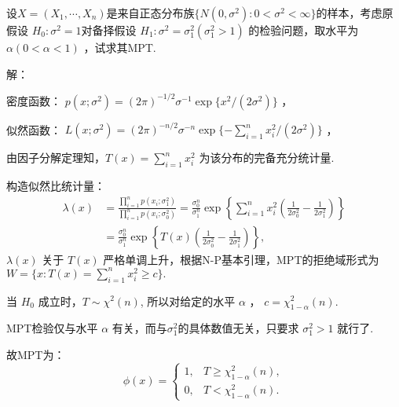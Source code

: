 \begin{example}
    设$ X=\left(X_{1}, \cdots, X_{n}\right) $是来自正态分布族$ \{N(0, \sigma^{2}): 0<\sigma^{2}<\infty\} $的样本，考虑原假设 $H_{0}: \sigma^{2}=1 $对备择假设 $H_{1}: \sigma^{2}=\sigma_{1}^{2}(\sigma_{1}^{2}>1)$ 的检验问题，取水平为 $\alpha(0<\alpha<1)$ ，试求其MPT.

    解：

    密度函数： $p(x;\sigma^2)=(2\pi)^{-1/2}\sigma^{-1} \exp\{ {x^2}/{(2\sigma^2)} \}$ ，

    似然函数： $L(x;\sigma^2)=(2\pi)^{-n/2}\sigma^{-n}\exp\{ -\sum_{i=1}^{n}{x_i^2}/{(2\sigma^2)} \}$ ，

    由因子分解定理知，$ T(x)=\sum_{i=1}^{n} x_{i}^{2}$ 为该分布的完备充分统计量.

    构造似然比统计量： 
    \[
        \begin{aligned} \lambda(x)&=\frac{\prod_{i=1}^{n} p\left(x_{i} ; \sigma_{1}^{2}\right)}{\prod_{i=1}^{n} p\left(x_{i} ; \sigma_{0}^{2}\right)}=\frac{\sigma_{0}^{n}}{\sigma_{1}^{n}} \exp \left\{ \sum_{i=1}^{n} x_{i}^{2}\left(\frac{1}{2 \sigma_{0}^{2}}-\frac{1}{2 \sigma_{1}^{2}}\right) \right\} \\ &=\frac{\sigma_{0}^{n}}{\sigma_{1}^{n}} \exp \left\{ T(x)\left(\frac{1}{2 \sigma_{0}^{2}}-\frac{1}{2 \sigma_{1}^{2}}\right) \right\}, \end{aligned}
    \]
     $\lambda(x)$ 关于 $T(x)$ 严格单调上升，根据N-P基本引理，MPT的拒绝域形式为 $W=\{x: T(x)=\sum_{i=1}^{n} x_{i}^{2} \geqslant c\}.$

     当 $H_{0}$ 成立时，$ T \sim \chi^{2}(n) $, 所以对给定的水平 $\alpha$ ， $c=\chi_{1-\alpha}^{2}(n) .$

    MPT检验仅与水平 $\alpha$ 有关，而与$ \sigma_{1}^2 $的具体数值无关，只要求 $\sigma_{1}^2>1$ 就行了.

    故MPT为： 
    \[
        \phi(x)=\left\{\begin{array}{ll} 1, & T \geqslant \chi_{1-\alpha}^{2}(n), \\ 0, & T<\chi_{1-\alpha}^{2}(n). \end{array}\right.
    \]
\end{example}





